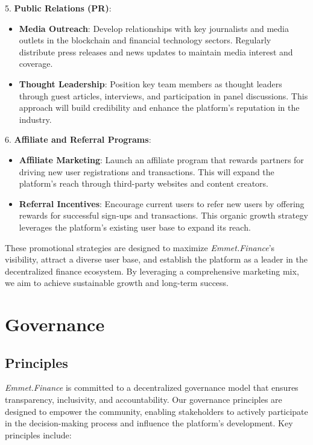 \documentclass[12pt, a4paper]{article}
\begin{document}
5. \textbf{Public Relations (PR)}:
   \begin{itemize}
       \item \textbf{Media Outreach}: Develop relationships with key journalists and media outlets in the blockchain and financial technology sectors. Regularly distribute press releases and news updates to maintain media interest and coverage.
       \item \textbf{Thought Leadership}: Position key team members as thought leaders through guest articles, interviews, and participation in panel discussions. This approach will build credibility and enhance the platform's reputation in the industry.
   \end{itemize}

6. \textbf{Affiliate and Referral Programs}:
   \begin{itemize}
       \item \textbf{Affiliate Marketing}: Launch an affiliate program that rewards partners for driving new user registrations and transactions. This will expand the platform's reach through third-party websites and content creators.
       \item \textbf{Referral Incentives}: Encourage current users to refer new users by offering rewards for successful sign-ups and transactions. This organic growth strategy leverages the platform's existing user base to expand its reach.
   \end{itemize}

These promotional strategies are designed to maximize \textit{Emmet.Finance}'s visibility, attract a diverse user base, and establish the platform as a leader in the decentralized finance ecosystem. By leveraging a comprehensive marketing mix, we aim to achieve sustainable growth and long-term success.

\section{Governance}

\subsection{Principles}

\textit{Emmet.Finance} is committed to a decentralized governance model that ensures transparency, inclusivity, and accountability. Our governance principles are designed to empower the community, enabling stakeholders to actively participate in the decision-making process and influence the platform's development. Key principles include:
\end{document}
